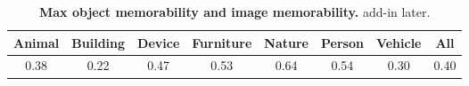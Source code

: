\begin{table}[b]
    \begin{tabular}{cccccccc}
    \hline
    Animal & Building & Device & Furniture & Nature & Person & Vehicle & All  \\ \hline
    0.38   & 0.22     & 0.47   & 0.53      & 0.64   & 0.54   & 0.30    & 0.40 \\ \hline
    \end{tabular}
    \caption{\footnotesize\textbf{Max object memorability and image memorability.} add-in later. }\label{tab:tableMem}
\end{table}



